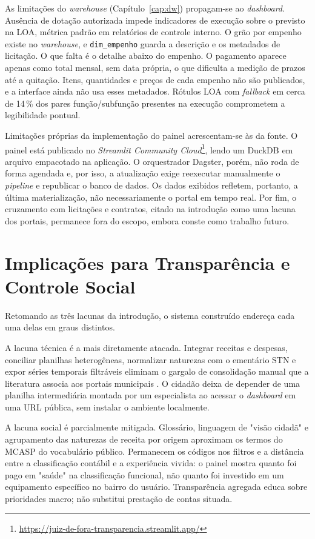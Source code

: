 As limitações do \textit{warehouse} (Capítulo~\ref{cap:dw}) propagam-se ao \textit{dashboard}. Ausência de dotação autorizada impede indicadores de execução sobre o previsto na LOA, métrica padrão em relatórios de controle interno. O grão por empenho existe no \textit{warehouse}, e \texttt{dim\_empenho} guarda a descrição e os metadados de licitação. O que falta é o detalhe abaixo do empenho. O pagamento aparece apenas como total mensal, sem data própria, o que dificulta a medição de prazos até a quitação. Itens, quantidades e preços de cada empenho não são publicados, e a interface ainda não usa esses metadados. Rótulos LOA com \textit{fallback} em cerca de 14\,\% dos pares função/subfunção presentes na execução comprometem a legibilidade pontual.

Limitações próprias da implementação do painel acrescentam-se às da fonte. O painel está publicado no \textit{Streamlit Community Cloud}\footnote{\url{https://juiz-de-fora-transparencia.streamlit.app/}}, lendo um DuckDB em arquivo empacotado na aplicação. O orquestrador Dagster, porém, não roda de forma agendada e, por isso, a atualização exige reexecutar manualmente o \textit{pipeline} e republicar o banco de dados. Os dados exibidos refletem, portanto, a última materialização, não necessariamente o portal em tempo real. Por fim, o cruzamento com licitações e contratos, citado na introdução como uma lacuna dos portais, permanece fora do escopo, embora conste como trabalho futuro.

\section{Implicações para Transparência e Controle Social}

Retomando as três lacunas da introdução, o sistema construído endereça cada uma delas em graus distintos.

A lacuna técnica é a mais diretamente atacada. Integrar receitas e despesas, conciliar planilhas heterogêneas, normalizar naturezas com o ementário STN e expor séries temporais filtráveis eliminam o gargalo de consolidação manual que a literatura associa aos portais municipais \cite{marco2022transparencia,melo2019proposta}. O cidadão deixa de depender de uma planilha intermediária montada por um especialista ao acessar o \textit{dashboard} em uma URL pública, sem instalar o ambiente localmente.

A lacuna social é parcialmente mitigada. Glossário, linguagem de "visão cidadã" e agrupamento das naturezas de receita por origem aproximam os termos do MCASP do vocabulário público. Permanecem os códigos nos filtros e a distância entre a classificação contábil e a experiência vivida: o painel mostra quanto foi pago em "saúde" na classificação funcional, não quanto foi investido em um equipamento específico no bairro do usuário. Transparência agregada educa sobre prioridades macro; não substitui prestação de contas situada.

